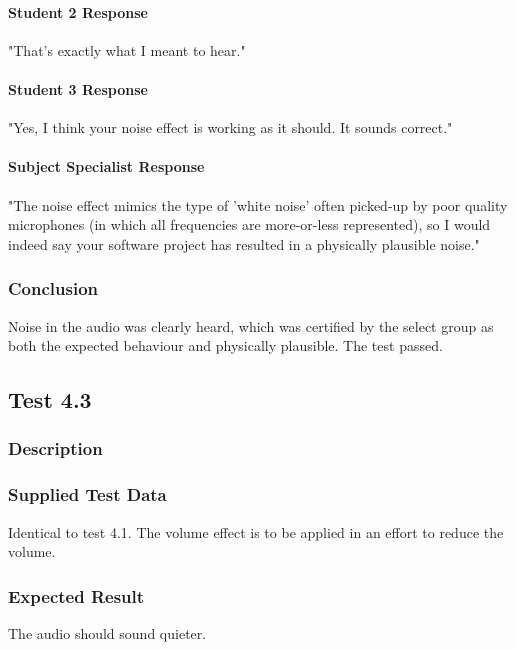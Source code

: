 \paragraph{Student 2 Response}
"That's exactly what I meant to hear."

\paragraph{Student 3 Response}
"Yes, I think your noise effect is working as it should. It sounds correct."

\paragraph{Subject Specialist Response}
"The noise effect mimics the type of 'white noise' often picked-up by poor quality microphones (in which all frequencies are more-or-less represented), so I would indeed say your software project has resulted in a physically plausible noise."

\subsubsection*{Conclusion}
Noise in the audio was clearly heard, which was certified by the select group as both the expected behaviour and physically plausible. The test passed.


\pagebreak
\subsection{Test 4.3}
\subsubsection*{Description}
\paragraph{}
{
	\centering
}

\subsubsection*{Supplied Test Data}
Identical to test 4.1. The volume effect is to be applied in an effort to reduce the volume.

\subsubsection*{Expected Result}
The audio should sound quieter.


